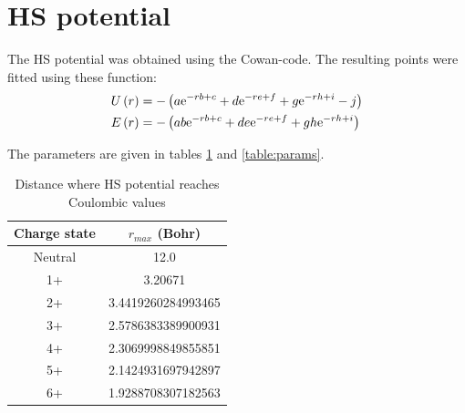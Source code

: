 \documentclass[12pt,letterpaper]{article}
\title{\mytitle}
\date{}
\author{Nicolas Bigaouette}
\begin{document}
\maketitle

\tableofcontents



\section{HS potential}
The HS potential was obtained using the Cowan-code. The resulting points were fitted using these function:
\begin{align}
U\left( r \right) & = - \left(  a   \textrm{e}^{-r b + c} + d   \textrm{e}^{-r e + f} + g   \textrm{e}^{-r h + i} - j  \right) \\
E\left( r \right) & = - \left(  a b \textrm{e}^{-r b + c} + d e \textrm{e}^{-r e + f} + g h \textrm{e}^{-r h + i}  \right)
\end{align}

The parameters are given in tables \ref{table:rmax} and \ref{table:params}.

\begin{table}
\begin{center}
\begin{tabular}{|c|c|} \hline
Charge state    & $r_{max}$ (Bohr)      \\ \hline \hline
Neutral         & 12.0                  \\ \hline
1+              & 3.20671               \\ \hline
2+              & 3.4419260284993465    \\ \hline
3+              & 2.5786383389900931    \\ \hline
4+              & 2.3069998849855851    \\ \hline
5+              & 2.1424931697942897    \\ \hline
6+              & 1.9288708307182563    \\ \hline
\end{tabular}
\end{center}
\caption{\label{table:rmax}Distance where HS potential reaches Coulombic values}
\end{table}
\end{document}
